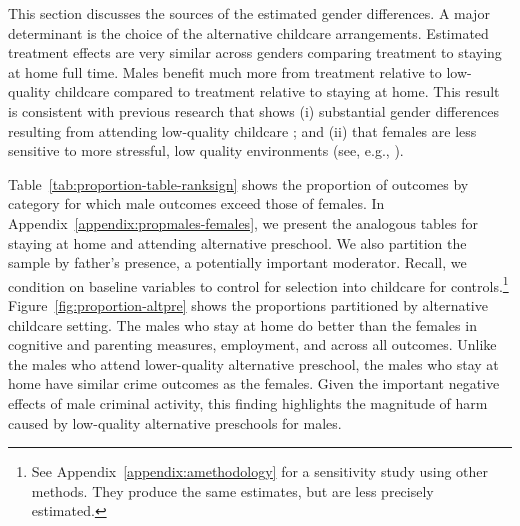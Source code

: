 This section discusses the sources of the estimated gender differences. A major determinant is the choice of the alternative childcare arrangements. Estimated treatment effects are very similar across genders comparing treatment to staying at home full time. Males benefit much more from treatment relative to low-quality childcare compared to treatment relative to staying at home. This result is consistent with previous research that shows (i) substantial gender differences resulting from attending low-quality childcare \citep{Kottelenberg-Lehrer_2014_Gender-Effects,Baker_Gruber_Milligan_2015_Noncog_Defects}; and (ii) that females are less sensitive to more stressful, low quality environments (see, e.g., \citealp{golding2016psychology,Autor-etal_2015_Family-Disadvantage}).

Table~\ref{tab:proportion-table-ranksign} shows the proportion of outcomes by category for which male outcomes exceed those of females. In Appendix~\ref{appendix:propmales-females}, we present the analogous tables for staying at home and attending alternative preschool. We also partition the sample by father's presence, a potentially important moderator. Recall, we condition on baseline variables to control for selection into childcare for controls.\footnote{See Appendix~\ref{appendix:amethodology} for a sensitivity study using other methods. They produce the same estimates, but are less precisely estimated.} Figure~\ref{fig:proportion-altpre} shows the proportions partitioned by alternative childcare setting. The males who stay at home do better than the females in cognitive and parenting measures, employment, and across all outcomes. Unlike the males who attend lower-quality alternative preschool, the males who stay at home have similar crime outcomes as the females. Given the important negative effects of male criminal activity, this finding highlights the magnitude of harm caused by low-quality alternative preschools for males.

